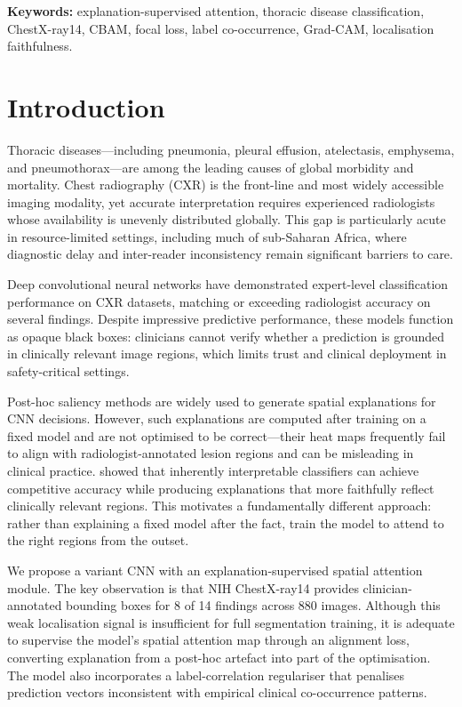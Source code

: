 \documentclass[12pt, a4paper]{article}
\begin{document}
\medskip
\noindent\textbf{Keywords:} explanation-supervised attention, thoracic disease
classification, ChestX-ray14, CBAM, focal loss, label co-occurrence, Grad-CAM,
localisation faithfulness.

\tableofcontents
\newpage

\section{Introduction}

Thoracic diseases---including pneumonia, pleural effusion, atelectasis, emphysema, and
pneumothorax---are among the leading causes of global morbidity and mortality. Chest
radiography (CXR) is the front-line and most widely accessible imaging modality, yet
accurate interpretation requires experienced radiologists whose availability is unevenly
distributed globally. This gap is particularly acute in resource-limited settings,
including much of sub-Saharan Africa, where diagnostic delay and inter-reader
inconsistency remain significant barriers to care.

Deep convolutional neural networks have demonstrated expert-level classification
performance on CXR datasets, matching or exceeding radiologist accuracy on several
findings. Despite impressive predictive performance, these models function as opaque
black boxes: clinicians cannot verify whether a prediction is grounded in clinically
relevant image regions, which limits trust and clinical deployment in safety-critical
settings.

Post-hoc saliency methods are widely used to generate spatial explanations for CNN
decisions. However, such explanations are computed after training on a fixed model and are
not optimised to be correct---their heat maps frequently fail to align with
radiologist-annotated lesion regions and can be misleading in clinical practice.
\citet{attrinet2023} showed that inherently interpretable classifiers can achieve
competitive accuracy while producing explanations that more faithfully reflect
clinically relevant regions. This motivates a fundamentally different approach: rather
than explaining a fixed model after the fact, train the model to attend to the right
regions from the outset.

We propose a variant CNN with an explanation-supervised spatial attention module. The key
observation is that NIH ChestX-ray14 provides clinician-annotated bounding boxes for 8 of
14 findings across 880 images. Although this weak localisation signal is insufficient for
full segmentation training, it is adequate to supervise the model's spatial attention map
through an alignment loss, converting explanation from a post-hoc artefact into part of
the optimisation. The model also incorporates a label-correlation regulariser that
penalises prediction vectors inconsistent with empirical clinical co-occurrence patterns.
\end{document}
